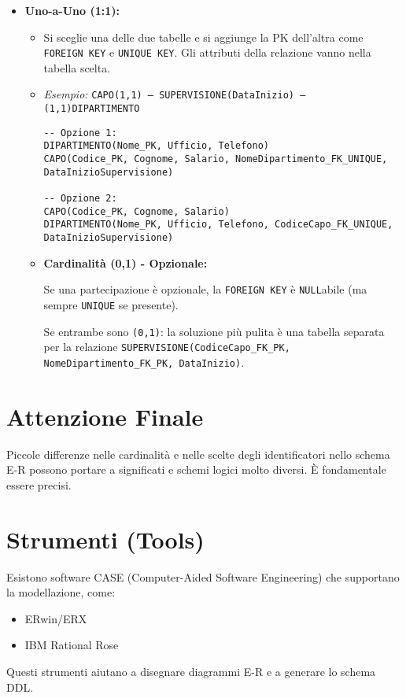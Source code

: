 \begin{itemize}
\begin{itemize}
		\item \textbf{Uno-a-Uno (1:1):}
		\begin{itemize}
			\item Si sceglie una delle due tabelle e si aggiunge la PK dell'altra come \texttt{FOREIGN KEY} e \texttt{UNIQUE KEY}. Gli attributi della relazione vanno nella tabella scelta.
			\item \textit{Esempio:} \texttt{CAPO(1,1) --- SUPERVISIONE(DataInizio) --- (1,1)DIPARTIMENTO}
			\begin{verbatim}
-- Opzione 1:
DIPARTIMENTO(Nome_PK, Ufficio, Telefono)
CAPO(Codice_PK, Cognome, Salario, NomeDipartimento_FK_UNIQUE, DataInizioSupervisione)

-- Opzione 2:
CAPO(Codice_PK, Cognome, Salario)
DIPARTIMENTO(Nome_PK, Ufficio, Telefono, CodiceCapo_FK_UNIQUE, DataInizioSupervisione)
			\end{verbatim}
			\item \textbf{Cardinalità (0,1) - Opzionale:}
			
			Se una partecipazione è opzionale, la \texttt{FOREIGN KEY} è \texttt{NULL}abile (ma sempre \texttt{UNIQUE} se presente).
			
			Se entrambe sono \texttt{(0,1)}: la soluzione più pulita è una tabella separata per la relazione \texttt{SUPERVISIONE(CodiceCapo\_FK\_PK, NomeDipartimento\_FK\_PK, DataInizio)}.
		\end{itemize}
	\end{itemize}
\end{itemize}

\section{Attenzione Finale}
Piccole differenze nelle cardinalità e nelle scelte degli identificatori nello schema E-R possono portare a significati e schemi logici molto diversi. È fondamentale essere precisi.

\section{Strumenti (Tools)}
Esistono software CASE (Computer-Aided Software Engineering) che supportano la modellazione, come:
\begin{itemize}
	\item ERwin/ERX
	\item IBM Rational Rose
\end{itemize}
Questi strumenti aiutano a disegnare diagrammi E-R e a generare lo schema DDL.

